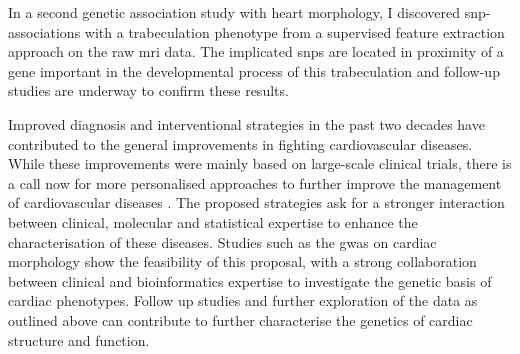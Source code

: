 In a second genetic association study with heart morphology, I discovered \gls{snp}-associations with a trabeculation phenotype from a supervised feature extraction approach on the raw \gls{mri} data. The implicated \glspl{snp} are located in proximity of a gene important in the developmental process of this trabeculation and follow-up studies are underway to confirm these results.

Improved diagnosis and interventional strategies in the past two decades have contributed to the general improvements in fighting cardiovascular diseases. While these improvements were mainly based on large-scale clinical trials, there is a call now for more personalised approaches to further improve the management of cardiovascular diseases \citep{Meder2016}. The proposed strategies ask for a stronger interaction between clinical, molecular and statistical expertise to enhance the characterisation of these diseases. Studies such as the \gls{gwas} on cardiac morphology show the feasibility of this proposal, with a strong collaboration between clinical and bioinformatics expertise to investigate the genetic basis of cardiac phenotypes. Follow up studies and further exploration of the data as outlined above can contribute to further characterise the genetics of cardiac structure and function. 



